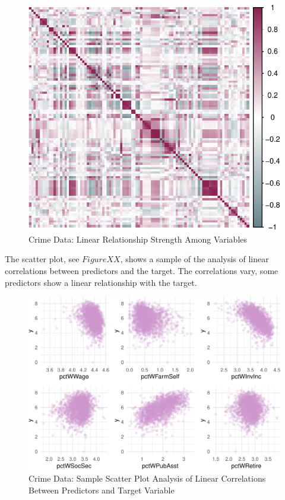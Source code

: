\documentclass[
  11pt,
]{article}
\begin{document}
\begin{figure}[H]

{\centering \includegraphics[width=0.70\linewidth]{dissertation_files/figure-latex/Correlations Plot-1} 

}

\caption{Crime Data: Linear Relationship Strength Among Variables}\label{fig:Correlations Plot}
\end{figure}

The scatter plot, see \(Figure XX\), shows a sample of the analysis of
linear correlations between predictors and the target. The correlations
vary, some predictors show a linear relationship with the target.

\begin{figure}[H]

{\centering \includegraphics[width=0.75\linewidth]{dissertation_files/figure-latex/Scatter Plot-1} 

}

\caption{Crime Data: Sample Scatter Plot Analysis of Linear Correlations Between Predictors and Target Variable}\label{fig:Scatter Plot}
\end{figure}
\end{document}
